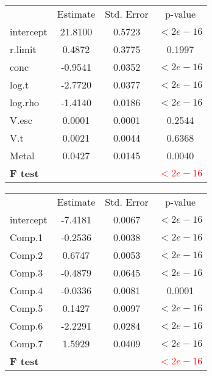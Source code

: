 \documentclass[xcolor=table]{beamer}
\begin{document}
\begin{frame}

\fontsize{5.5pt}{8pt}\selectfont
\centering
\begin{tabular}{ |l|S|S|c| }
\hline
{}  \\
\hline
{}
 & Estimate & Std. Error & p-value \\
\hline
intercept & 21.8100 & 0.5723 & $<2e-16$ \\
r.limit & 0.4872 & 0.3775 & 0.1997 \\
conc & -0.9541 & 0.0352 & $<2e-16$ \\
log.t & -2.7720 & 0.0377 & $<2e-16$ \\
log.rho & -1.4140 & 0.0186 & $<2e-16$ \\
V.esc & 0.0001 & 0.0001 & 0.2544 \\
V.t & 0.0021 & 0.0044 & 0.6368 \\
Metal & 0.0427 & 0.0145 & 0.0040 \\
\textbf{F test} &  &  & \textcolor{red}{$<2e-16$} \\
\hline
\end{tabular}
\hfill
\begin{tabular}{ |l|S|S|c| }
\hline
{}  \\
\hline
{}
 & Estimate & Std. Error & p-value \\
\hline
intercept & -7.4181 & 0.0067 & $<2e-16$ \\
Comp.1 & -0.2536 & 0.0038 & $<2e-16$ \\
Comp.2 & 0.6747 & 0.0053 & $<2e-16$ \\
Comp.3 & -0.4879 & 0.0645 & $<2e-16$ \\
Comp.4 & -0.0336 & 0.0081 & 0.0001 \\
Comp.5 & 0.1427 & 0.0097 & $<2e-16$ \\
Comp.6 & -2.2291 & 0.0284 & $<2e-16$ \\
Comp.7 & 1.5929 & 0.0409 & $<2e-16$ \\
\textbf{F test} &  &  & \textcolor{red}{$<2e-16$} \\
\hline
\end{tabular}

\smallskip\smallskip


\end{frame}
\end{document}
